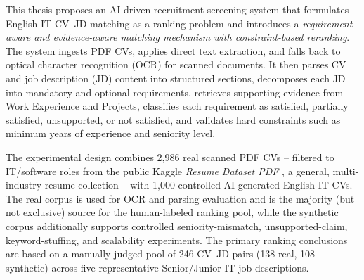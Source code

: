 \documentclass[12pt,a4paper,oneside]{report}
\begin{document}
This thesis proposes an AI-driven recruitment screening system that formulates English IT CV--JD matching as a ranking problem and introduces a \emph{requirement-aware and evidence-aware matching mechanism with constraint-based reranking}. The system ingests PDF CVs, applies direct text extraction, and falls back to optical character recognition (OCR) for scanned documents. It then parses CV and job description (JD) content into structured sections, decomposes each JD into mandatory and optional requirements, retrieves supporting evidence from Work Experience and Projects, classifies each requirement as satisfied, partially satisfied, unsupported, or not satisfied, and validates hard constraints such as minimum years of experience and seniority level.

The experimental design combines 2,986 real scanned PDF CVs -- filtered to IT/software roles from the public Kaggle \emph{Resume Dataset PDF} \citep{hadikpresumepdf}, a general, multi-industry resume collection -- with 1,000 controlled AI-generated English IT CVs. The real corpus is used for OCR and parsing evaluation and is the majority (but not exclusive) source for the human-labeled ranking pool, while the synthetic corpus additionally supports controlled seniority-mismatch, unsupported-claim, keyword-stuffing, and scalability experiments. The primary ranking conclusions are based on a manually judged pool of 246 CV--JD pairs (138 real, 108 synthetic) across five representative Senior/Junior IT job descriptions.
\end{document}
